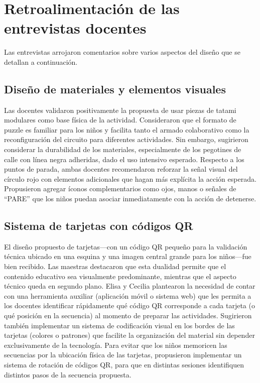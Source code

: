 \documentclass{prgrado}
\begin{document}
\section{Retroalimentación de las entrevistas docentes}

Las entrevistas arrojaron comentarios sobre varios aspectos del diseño que se detallan a continuación.

\subsection{Diseño de materiales y elementos visuales}
Las docentes validaron positivamente la propuesta de usar piezas de tatami modulares como base física de la actividad. Consideraron que el formato de puzzle es familiar para los niños y facilita tanto el armado colaborativo como la reconfiguración del circuito para diferentes actividades. Sin embargo, sugirieron considerar la durabilidad de los materiales, especialmente de los pegotines de calle con línea negra adheridas, dado el uso intensivo esperado.
Respecto a los puntos de parada, ambas docentes recomendaron reforzar la señal visual del círculo rojo con elementos adicionales que hagan más explícita la acción esperada. Propusieron agregar íconos complementarios como ojos, manos o señales de ``PARE'' que los niños puedan asociar inmediatamente con la acción de detenerse.
\subsection{Sistema de tarjetas con códigos QR}
El diseño propuesto de tarjetas---con un código QR pequeño para la validación técnica ubicado en una esquina y una imagen central grande para los niños---fue bien recibido. Las maestras destacaron que esta dualidad permite que el contenido educativo sea visualmente predominante, mientras que el aspecto técnico queda en segundo plano.
Elisa y Cecilia plantearon la necesidad de contar con una herramienta auxiliar (aplicación móvil o sistema web) que les permita a los docentes identificar rápidamente qué código QR corresponde a cada tarjeta (o qué posición en la secuencia) al momento de preparar las actividades. Sugirieron también implementar un sistema de codificación visual en los bordes de las tarjetas (colores o patrones) que facilite la organización del material sin depender exclusivamente de la tecnología.
Para evitar que los niños memoricen las secuencias por la ubicación física de las tarjetas, propusieron implementar un sistema de rotación de códigos QR, para que en distintas sesiones identifiquen distintos pasos de la secuencia propuesta.
\end{document}
